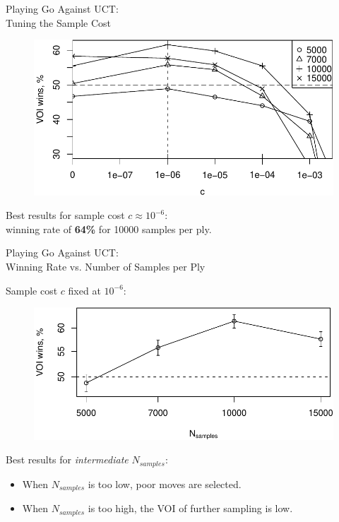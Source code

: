 \documentclass{beamer}
\begin{document}
\begin{frame}{Playing Go Against UCT:\\\hspace{2em}Tuning the Sample Cost}
\begin{figure}[h]
  \centering
  \includegraphics[scale=0.65]{uctvoi.pdf}
\end{figure}
Best results for sample cost $c\approx 10^{-6}$:\\\hspace{2em}winning rate of {\bf
  64\%} for 10000 samples per ply.
\end{frame}

\begin{frame}{Playing Go Against UCT:
    \\\hspace{1em} Winning Rate vs. Number of Samples per Ply}

Sample cost $c$ fixed at $10^{-6}$:
\begin{figure}
  \centering
  \includegraphics[scale=0.65]{voi-wins.pdf}
\end{figure}
Best results for {\it intermediate} $N_{samples}$:
\begin{itemize}
\item When $N_{samples}$ is too low, poor moves are selected.
\item When $N_{samples}$ is too high, the VOI of further sampling
  is low.
\end{itemize}
\end{frame}
\end{document}
